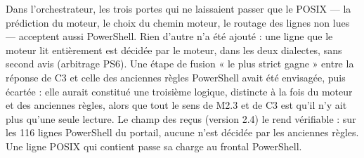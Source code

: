 Dans l'orchestrateur, les trois portes qui ne laissaient passer que le POSIX --- la prédiction du
moteur, le choix du chemin moteur, le routage des lignes non lues --- acceptent aussi
PowerShell. Rien d'autre n'a été ajouté : une ligne que le moteur lit entièrement est décidée par
le moteur, dans les deux dialectes, sans second avis (arbitrage PS6). Une étape de fusion « le plus
strict gagne » entre la réponse de C3 et celle des anciennes règles PowerShell avait été
envisagée, puis écartée : elle aurait constitué une troisième logique, distincte à la fois du
moteur et des anciennes règles, alors que tout le sens de M2.3 et de C3 est qu'il n'y ait plus
qu'une seule lecture. Le champ  des reçus (version 2.4) le rend vérifiable : sur
les 116 lignes PowerShell du portail, aucune n'est décidée par les anciennes règles. Une ligne
POSIX qui contient  passe sa charge au frontal PowerShell.

